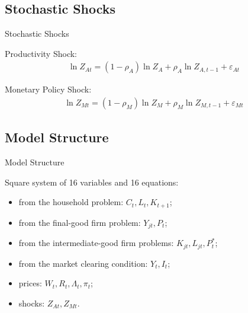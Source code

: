 \documentclass[../quali_slides.tex]{subfiles}
\begin{document}

\subsection{Stochastic Shocks}

\begin{frame}{Stochastic Shocks}
	
	Productivity Shock:
	\begin{align}
		\ln{Z_{At}} = (1-\rho_A)\ln{Z_A} + \rho_A\ln{Z_{A,t-1}} + \varepsilon_{At} \label{eq:productivity-shock}
	\end{align}
	
	Monetary Policy Shock:
	\begin{align}
		\ln{Z_{Mt}} = (1-\rho_M)\ln{Z_{M}} + \rho_M\ln{Z_{M,t-1}} + \varepsilon_{Mt} \label{eq:monetary-shock}
	\end{align}
	
	
\end{frame}


\subsection{Model Structure}

\begin{frame}[allowframebreaks]{Model Structure}
	
	{\singlespacing

Square system of 16 variables and 16 equations:

\begin{itemize}
	\item from the household problem: $C_t, L_t, K_{t+1}$;
	\item from the final-good firm problem: $Y_{jt}, P_t$;
	\item from the intermediate-good firm problems: $K_{jt}, L_{jt}, P_t^\ast$;
	\item from the market clearing condition: $Y_t, I_t$;
	\item prices: $W_t, R_t, \Lambda_t, \pi_t$;
	\item shocks: $Z_{At}, Z_{Mt}$.
\end{itemize}

	} %

\end{frame}
\end{document}
